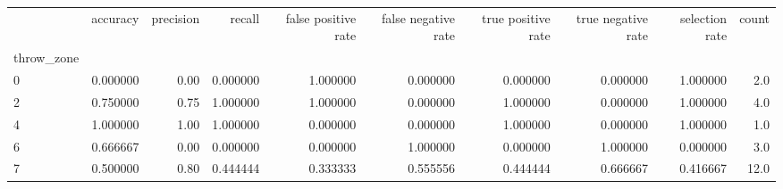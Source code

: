 \begin{tabular}{lrrrrrrrrr}
\toprule
{} &  accuracy &  precision &    recall &  false positive rate &  false negative rate &  true positive rate &  true negative rate &  selection rate &  count \\
throw\_zone &           &            &           &                      &                      &                     &                     &                 &        \\
\midrule
0          &  0.000000 &       0.00 &  0.000000 &             1.000000 &             0.000000 &            0.000000 &            0.000000 &        1.000000 &    2.0 \\
2          &  0.750000 &       0.75 &  1.000000 &             1.000000 &             0.000000 &            1.000000 &            0.000000 &        1.000000 &    4.0 \\
4          &  1.000000 &       1.00 &  1.000000 &             0.000000 &             0.000000 &            1.000000 &            0.000000 &        1.000000 &    1.0 \\
6          &  0.666667 &       0.00 &  0.000000 &             0.000000 &             1.000000 &            0.000000 &            1.000000 &        0.000000 &    3.0 \\
7          &  0.500000 &       0.80 &  0.444444 &             0.333333 &             0.555556 &            0.444444 &            0.666667 &        0.416667 &   12.0 \\
\bottomrule
\end{tabular}
